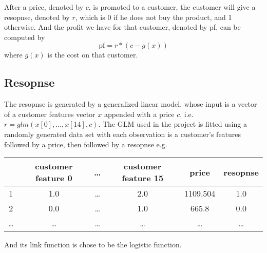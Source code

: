 \documentclass[11pt]{article}
\begin{document}
\noindent After a price, denoted by \(c\), is promoted to a customer, the 
customer will give a resopnse, denoted by \(r\), which is 0 if he does not buy
the product, and 1 otherwise. And the profit we have for that customer, 
denoted by pf, can be computed by
\[\text{pf} = r*\left(c - g(x)\right)\]
where \(g(x)\) is the cost on that customer.

\subsection{Resopnse}
The resopnse is generated by a generalized linear model, whose input is a 
vector of a customer features vector \(x\) appended with a price \(c\), i.e.
\(r=glm(x[0], \dots, x[14], c)\).
\vspace{3mm}\newline The GLM used in the project is fitted using a randomly
generated data set with each observation is a customer's features followed by 
a price, then followed by a resopnse e.g.
\begin{table}[htpb]
    \centering
    \begin{tabular}{c|c|c|c|c|c}
        & customer feature 0 & \dots & customer feature 15 & price & resopnse\\
        \hline
        1 & 1.0 & \dots & 2.0 & 1109.504 & 1.0\\
        \hline
        2 & 0.0 & \dots & 1.0 & 665.8 & 0.0\\
        \hline
        \dots & \dots & \dots & \dots & \dots & \dots
    \end{tabular}
\end{table}

\noindent And its link function is chose to be the logistic function.
\end{document}
